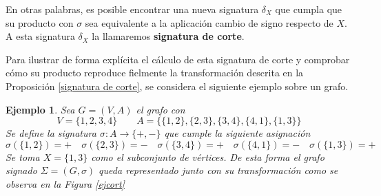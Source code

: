 \documentclass[11pt,a4paper,spanish]{report}
\theoremstyle{plain}
\newtheorem{ejemplo}{Ejemplo}[chapter]
\begin{document}
En otras palabras, es posible encontrar una nueva signatura $\delta_X$ que cumpla que su producto con $\sigma$ sea equivalente a la aplicación cambio de signo respecto de $X$. A esta signatura $\delta_X$ la llamaremos \textbf{signatura de corte}.

Para ilustrar de forma explícita el cálculo de esta signatura de corte y comprobar cómo su producto reproduce fielmente la transformación descrita en la Proposición \ref{signatura de corte}, se considera el siguiente ejemplo sobre un grafo.

\begin{ejemplo} \label{111}
Sea $G=(V,A)$ el grafo con
\[
V = \{1,2,3,4\} \qquad 
A = \{\{1,2\}, \{2,3\}, \{3,4\}, \{4,1\}, \{1,3\}\}
\]
Se define la signatura $\sigma \colon A \longrightarrow \{+,-\}$ que cumple la siguiente asignación
\[
\sigma(\{1,2\}) = + \quad
\sigma(\{2,3\}) = - \quad
\sigma(\{3,4\}) = + \quad
\sigma(\{4,1\}) = - \quad
\sigma(\{1,3\}) = +
\]
Se toma $X = \{1,3\}$ como el subconjunto de vértices. De esta forma el grafo signado $\Sigma=(G,\sigma)$ queda representado junto con su transformación como se observa en la Figura \ref{ejcort}

\begin{figure}[H]
\begin{center}
\end{center}
\end{figure}
\end{ejemplo}
\end{document}
